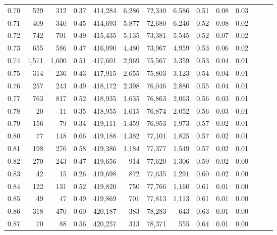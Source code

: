 \begin{tabular}{rrrrrrrrrrrrrr}
0.70 &     529 &    312 &  0.37 &  414,284 &    6,286 &  72,340 &   6,586 &  0.51 &  0.08 &      0.03 \\
0.71 &     409 &    340 &  0.45 &  414,693 &    5,877 &  72,680 &   6,246 &  0.52 &  0.08 &      0.02 \\
0.72 &     742 &    701 &  0.49 &  415,435 &    5,135 &  73,381 &   5,545 &  0.52 &  0.07 &      0.02 \\
0.73 &     655 &    586 &  0.47 &  416,090 &    4,480 &  73,967 &   4,959 &  0.53 &  0.06 &      0.02 \\
0.74 &   1,511 &  1,600 &  0.51 &  417,601 &    2,969 &  75,567 &   3,359 &  0.53 &  0.04 &      0.01 \\
0.75 &     314 &    236 &  0.43 &  417,915 &    2,655 &  75,803 &   3,123 &  0.54 &  0.04 &      0.01 \\
0.76 &     257 &    243 &  0.49 &  418,172 &    2,398 &  76,046 &   2,880 &  0.55 &  0.04 &      0.01 \\
0.77 &     763 &    817 &  0.52 &  418,935 &    1,635 &  76,863 &   2,063 &  0.56 &  0.03 &      0.01 \\
0.78 &      20 &     11 &  0.35 &  418,955 &    1,615 &  76,874 &   2,052 &  0.56 &  0.03 &      0.01 \\
0.79 &     156 &     79 &  0.34 &  419,111 &    1,459 &  76,953 &   1,973 &  0.57 &  0.02 &      0.01 \\
0.80 &      77 &    148 &  0.66 &  419,188 &    1,382 &  77,101 &   1,825 &  0.57 &  0.02 &      0.01 \\
0.81 &     198 &    276 &  0.58 &  419,386 &    1,184 &  77,377 &   1,549 &  0.57 &  0.02 &      0.01 \\
0.82 &     270 &    243 &  0.47 &  419,656 &      914 &  77,620 &   1,306 &  0.59 &  0.02 &      0.00 \\
0.83 &      42 &     15 &  0.26 &  419,698 &      872 &  77,635 &   1,291 &  0.60 &  0.02 &      0.00 \\
0.84 &     122 &    131 &  0.52 &  419,820 &      750 &  77,766 &   1,160 &  0.61 &  0.01 &      0.00 \\
0.85 &      49 &     47 &  0.49 &  419,869 &      701 &  77,813 &   1,113 &  0.61 &  0.01 &      0.00 \\
0.86 &     318 &    470 &  0.60 &  420,187 &      383 &  78,283 &     643 &  0.63 &  0.01 &      0.00 \\
0.87 &      70 &     88 &  0.56 &  420,257 &      313 &  78,371 &     555 &  0.64 &  0.01 &      0.00 \\

\end{tabular}
